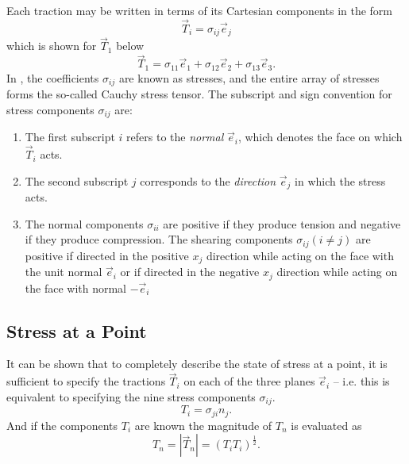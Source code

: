 Each traction may be written in terms of its Cartesian components in the form
\begin{equation} \label{eq:stressvec}
  \Vec{T}_i = \sigma_{ij} \Vec{e}_j
\end{equation}
which is shown for $\Vec{T}_1$ below
\begin{equation*}
  \Vec{T}_1 = \sigma_{11} \Vec{e}_1 + \sigma_{12} \Vec{e}_2 + \sigma_{13} \Vec{e}_3
.\end{equation*}
In , the coefficients $\sigma_{ij}$ are known as stresses, and the entire array of stresses forms the so-called Cauchy stress tensor.
The subscript and sign convention for stress components $\sigma_{ij}$ are:
\begin{enumerate}
  \item The first subscript $i$ refers to the \textit{normal} $\Vec{e}_i$, which denotes the face on which $\Vec{T}_i$ acts.
  \item The second subscript $j$ corresponds to the \textit{direction} $\Vec{e}_j$ in which the stress acts.
  \item The normal components $\sigma_{i i}$ are positive if they produce tension and negative if they produce compression.
    The shearing components $\sigma_{ij} (i \neq j)$ are positive if directed in the positive $x_j$ direction while acting on the face with the unit normal $\Vec{e}_i$ or if directed in the negative $x_j$ direction while acting on the face with normal $-\Vec{e}_i$
\end{enumerate}

\subsection{Stress at a Point}
It can be shown that to completely describe the state of stress at a point, it is sufficient to specify the tractions $\Vec{T}_i$ on each of the three planes $\Vec{e}_i$ -- i.e. this is equivalent to specifying the nine stress components $\sigma_{ij}$.
\begin{equation} \label{eq:stresspoint}
  T_i = \sigma_{ji} n_j
.\end{equation}
And if the components $T_i$ are known the magnitude of $T_n$ is evaluated as
\begin{equation*}
  T_n = \left| \Vec{T}_n \right| = \left( T_i T_i \right)^{\frac{1}{2}}
.\end{equation*}


